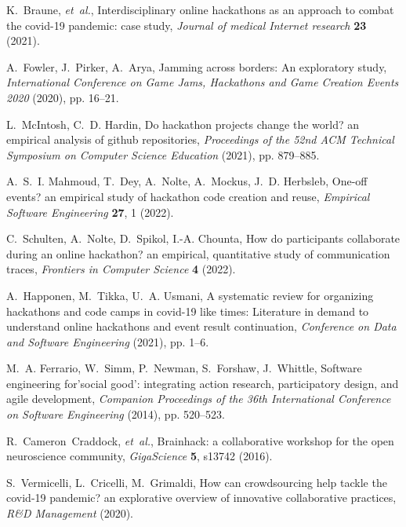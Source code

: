 \documentclass{ieeeaccess}
\begin{document}
\begin{thebibliography}{10}
K.~Braune, {\it et~al.\/}, Interdisciplinary online hackathons as an approach
  to combat the covid-19 pandemic: case study, {\it Journal of medical Internet
  research\/} {\bf 23} (2021).

A.~Fowler, J.~Pirker, A.~Arya, Jamming across borders: An exploratory study,
  {\it International Conference on Game Jams, Hackathons and Game Creation
  Events 2020\/} (2020), pp. 16--21.

L.~McIntosh, C.~D. Hardin, Do hackathon projects change the world? an empirical
  analysis of github repositories, {\it Proceedings of the 52nd ACM Technical
  Symposium on Computer Science Education\/} (2021), pp. 879--885.

A.~S.~I. Mahmoud, T.~Dey, A.~Nolte, A.~Mockus, J.~D. Herbsleb, One-off events?
  an empirical study of hackathon code creation and reuse, {\it Empirical
  Software Engineering\/} {\bf 27}, 1 (2022).

C.~Schulten, A.~Nolte, D.~Spikol, I.-A. Chounta, How do participants
  collaborate during an online hackathon? an empirical, quantitative study of
  communication traces, {\it Frontiers in Computer Science\/} {\bf 4} (2022).

A.~Happonen, M.~Tikka, U.~A. Usmani, A systematic review for organizing
  hackathons and code camps in covid-19 like times: Literature in demand to
  understand online hackathons and event result continuation, {\it Conference
  on Data and Software Engineering\/} (2021), pp. 1--6.

M.~A. Ferrario, W.~Simm, P.~Newman, S.~Forshaw, J.~Whittle, Software
  engineering for'social good': integrating action research, participatory
  design, and agile development, {\it Companion Proceedings of the 36th
  International Conference on Software Engineering\/} (2014), pp. 520--523.

R.~Cameron~Craddock, {\it et~al.\/}, Brainhack: a collaborative workshop for
  the open neuroscience community, {\it GigaScience\/} {\bf 5}, s13742 (2016).

S.~Vermicelli, L.~Cricelli, M.~Grimaldi, How can crowdsourcing help tackle the
  covid-19 pandemic? an explorative overview of innovative collaborative
  practices, {\it R\&D Management\/}  (2020).


\end{thebibliography}
\end{document}
